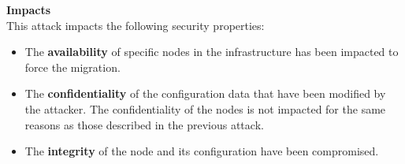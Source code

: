 \textbf{Impacts}\textbf{\\}
This attack impacts the following security properties:
\begin{itemize}
    \item The \textbf{availability} of specific nodes in the infrastructure has been impacted to force the migration.
    \item The \textbf{confidentiality} of the configuration data that have been modified by the attacker.
    The confidentiality of the nodes is not impacted for the same reasons as those described in the previous attack.
    \item The \textbf{integrity} of the node and its configuration have been compromised.





\end{itemize}
% 
